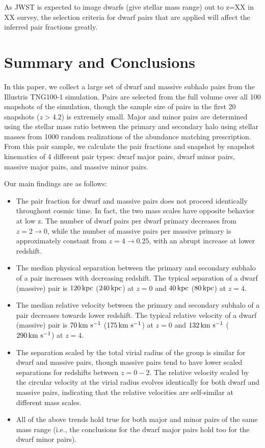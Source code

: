 \documentclass[twocolumn]{aastex631}
\begin{document}
As JWST is expected to image dwarfs (give stellar mass range) out to z=XX in XX survey, the selection criteria for dwarf pairs that are applied will affect the inferred pair fractions greatly. 



\pagebreak
\section{Summary and Conclusions}\label{sec:summary}
In this paper, we collect a large set of dwarf and massive subhalo pairs from the Illustris TNG100-1 simulation. 
Pairs are selected from the full volume over all 100 snapshots of the simulation, though the sample size of pairs in the first 20 snapshots ($z>4.2$) is extremely small. 
Major and minor pairs are determined using the stellar mass ratio between the primary and secondary halo using stellar masses from 1000 random realizations of the abundance matching prescription. 
From this pair sample, we calculate the pair fractions and snapshot by snapshot kinematics of 4 different pair types: dwarf major pairs, dwarf minor pairs, massive major pairs, and massive minor pairs.

Our main findings are as follows:
\begin{itemize}
    \item The pair fraction for dwarf and massive pairs does not proceed identically throughout cosmic time. In fact, the two mass scales have opposite behavior at low z. The number of dwarf pairs per dwarf primary decreases from $z=2\to0$, while the number of massive pairs per massive primary is approximately constant from $z=4\to0.25$, with an abrupt increase at lower redshift. 
    \item The median physical separation between the primary and secondary subhalo of a pair increases with decreasing redshift. The typical separation of a dwarf (massive) pair is $120\,\mathrm{kpc}$ ($240\,\mathrm{kpc}$) at $z=0$ and $40\,\mathrm{kpc}$ ($80\,\mathrm{kpc}$) at $z=4$.
    \item The median relative velocity between the primary and secondary subhalo of a pair decreases towards lower redshift. The typical relative velocity of a dwarf (massive) pair is $70\,\mathrm{km}~\mathrm{s}^{-1}$ ($175\,\mathrm{km}~\mathrm{s}^{-1}$) at $z=0$ and $132\,\mathrm{km}~\mathrm{s}^{-1}$ ($290\,\mathrm{km}~\mathrm{s}^{-1}$) at $z=4$.
    \item The separation scaled by the total virial radius of the group is similar for dwarf and massive pairs, though massive pairs tend to have lower scaled separations for redshifts between $z=0-2$. The relative velocity scaled by the circular velocity at the virial radius evolves identically for both dwarf and massive pairs, indicating that the relative velocities are self-similar at different mass scales. 
    \item All of the above trends hold true for both major and minor pairs of the same mass range (i.e., the conclusions for the dwarf major pairs hold too for the dwarf minor pairs). 
\end{itemize}
\end{document}
